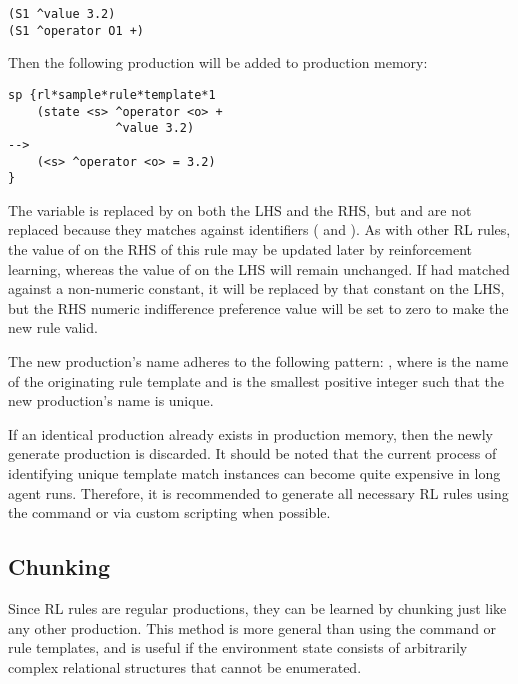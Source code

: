 \begin{verbatim}
(S1 ^value 3.2)
(S1 ^operator O1 +)
\end{verbatim}

Then the following production will be added to production memory:

\begin{verbatim}
sp {rl*sample*rule*template*1
    (state <s> ^operator <o> +
               ^value 3.2)
-->
    (<s> ^operator <o> = 3.2)
}
\end{verbatim}

The variable  is replaced by  on both the LHS and the RHS, but  and  are not replaced because they matches against identifiers ( and ).
As with other RL rules, the value of  on the RHS of this rule may be updated later by reinforcement learning, whereas the value of  on the LHS will remain unchanged.
If  had matched against a non-numeric constant, it will be replaced by that constant on the LHS, but the RHS numeric indifference preference value will be set to zero to make the new rule valid.

The new production's name adheres to the following pattern:
, where  is the name of the originating rule template and  is the smallest positive integer such that the new production's name is unique.

If an identical production already exists in production memory, then the newly generate production is discarded.
It should be noted that the current process of identifying unique template match instances can become quite expensive in long agent runs.
Therefore, it is recommended to generate all necessary RL rules using the  command or via custom scripting when possible.

\subsection{Chunking}
Since RL rules are regular productions, they can be learned by chunking just like any other production.
This method is more general than using the  command or rule templates, and is useful if the environment state consists of arbitrarily complex relational structures that cannot be enumerated.
